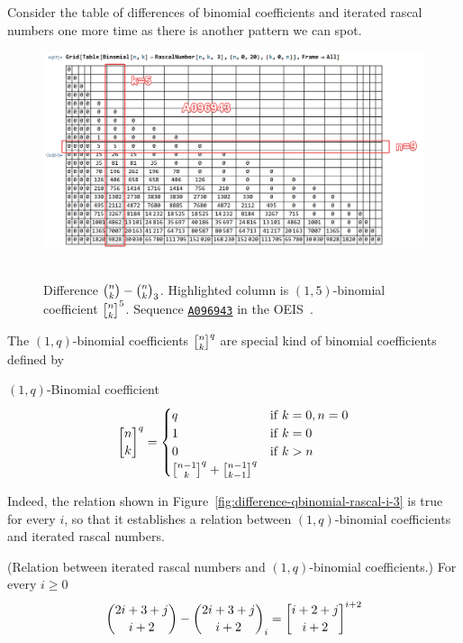 ﻿Consider the table of differences of binomial coefficients and iterated rascal numbers one more time
as there is another pattern we can spot.
\begin{figure}[H]
    \centering
    \includegraphics[width=1\textwidth]{img/03_Difference_Binomial_Rascal_i_3_OneQBinomialCoefficients}
    ~\caption{Difference $\binom{n}{k}-\binom{n}{k}_{3}$.
    Highlighted column is $(1,5)$-binomial coefficient $\oneQBinomial{n}{k}{5}$.
    Sequence \href{https://oeis.org/A096943}{\texttt{A096943}} in the OEIS~\cite{sloane2004sixth}.}
    \label{fig:difference-qbinomial-rascal-i-3}
\end{figure}
The $(1,q)$-binomial coefficients $\oneQBinomial{n}{k}{q}$ are special kind of binomial coefficients defined by
\begin{definition}
    $(1,q)$-Binomial coefficient
    \begin{equation}
        \oneQBinomial{n}{k}{q} =
        \begin{cases}
            q & \mathrm{if} \; k=0, n=0 \\
            1 & \mathrm{if} \; k=0 \\
            0 & \mathrm{if} \; k > n \\
            \oneQBinomial{n-1}{k}{q} + \oneQBinomial{n-1}{k-1}{q}
        \end{cases}\label{eq:qbinomial-definition}
    \end{equation}
\end{definition}
Indeed, the relation shown in Figure~\eqref{fig:difference-qbinomial-rascal-i-3} is true for every $i$,
so that it establishes a relation between $(1,q)$-binomial coefficients and iterated rascal numbers.
\begin{proposition} (Relation between iterated rascal numbers and $(1,q)$-binomial coefficients.)
    For every $i\geq0$
    \label{prop:row-column-difference-qbinomial}
    \begin{align*}
        \binom{2i+3+j}{i+2} - \rascalNumber{2i+3+j}{i+2}{i} = \oneQBinomial{i+2+j}{i+2}{i+2}
    \end{align*}
\end{proposition}
